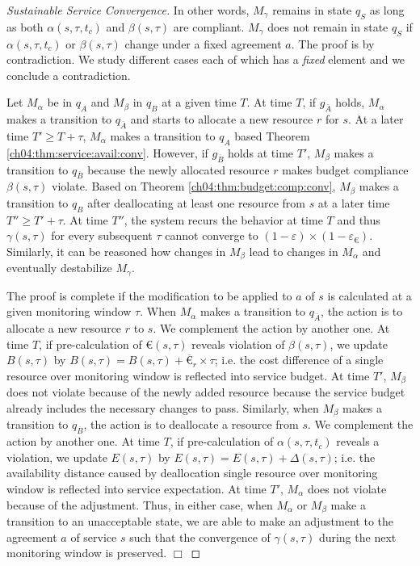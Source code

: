 \begin{proof}[Sustainable Service Convergence]
In other words, $M_\gamma$ remains in state $q_S$ as long as both $\alpha(s,\tau,t_c)$ and $\beta(s,\tau)$ are compliant.
$M_\gamma$ does not remain in state $q_S$ if $\alpha(s,\tau,t_c)$ or $\beta(s,\tau)$ change under a fixed agreement $a$.
The proof is by contradiction.
We study different cases each of which has a \emph{fixed} element and we conclude a contradiction. 

Let $M_\alpha$ be in $q_A$ and $M_\beta$ in $q_B$ at a given time $T$.
At time $T$, if $g_{\overline{A}}$ holds, $M_\alpha$ makes a transition to $q_{\overline{A}}$ and starts to allocate a new resource $r$ for $s$.
At a later time $T' \geq T + \tau$, $M_\alpha$ makes a transition to $q_A$ based Theorem \ref{ch04:thm:service:avail:conv}.
However, if $g_{\overline{B}}$ holds at time $T'$, $M_\beta$ makes a transition to $q_{\overline{B}}$ because the newly allocated resource $r$ makes budget compliance $\beta(s,\tau)$ violate.
Based on Theorem \ref{ch04:thm:budget:comp:conv}, $M_\beta$ makes a transition to $q_B$ after deallocating at least one resource from $s$ at a later time $T'' \geq T' + \tau$.
At time $T''$, the system recurs the behavior at time $T$ and thus $\gamma(s,\tau)$ for every subsequent $\tau$ cannot converge to $(1-\varepsilon)\times(1-\varepsilon_{\euro})$.
Similarly, it can be reasoned how changes in $M_\beta$ lead to changes in $M_\alpha$ and eventually destabilize $M_\gamma$.

The proof is complete if the modification to be applied to $a$ of $s$ is calculated at a given monitoring window $\tau$.
When $M_\alpha$ makes a transition to $q_{\overline{A}}$, the action is to allocate a new resource $r$ to $s$.
We complement the action by another one.
At time $T$, if pre-calculation of $\euro(s,\tau)$ reveals violation of $\beta(s,\tau)$, we update $B(s,\tau)$ by $B(s,\tau) = B(s,\tau) + \overline{\euro}_r \times \tau$; i.e. the cost difference of a single resource over monitoring window is reflected into service budget.
At time $T'$, $M_\beta$ does not violate because of the newly added resource because the service budget already includes the necessary changes to pass.
Similarly, when $M_\beta$ makes a transition to $q_{\overline{B}}$, the action is to deallocate a resource from $s$.
We complement the action by another one.
At time $T$, if pre-calculation of $\alpha(s,\tau,t_c)$ reveals a violation, we update $E(s,\tau)$ by $E(s,\tau) = E(s,\tau) + \Delta(s,\tau)$; i.e. the availability distance caused by deallocation single resource over monitoring window is reflected into service expectation.
At time $T'$, $M_\alpha$ does not violate because of the adjustment. 
Thus, in either case, when $M_\alpha$ or $M_\beta$ make a transition to an unacceptable state, we are able to make an adjustment to the agreement $a$ of service $s$ such that the convergence of $\gamma(s,\tau)$ during the next monitoring window is preserved. 
\newline
$\Box$
\end{proof}


